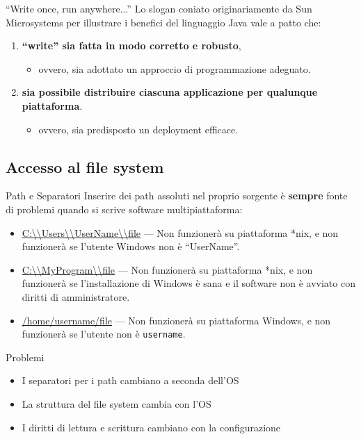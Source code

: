 \documentclass[presentation]{beamer}
\begin{document}
\begin{frame}{``Write once, run anywhere...''}
	Lo slogan coniato originariamente da Sun Microsystems per illustrare i benefici del linguaggio Java vale a patto che:
	\begin{enumerate}\itemsep10pt
		\item \textbf{``write'' sia fatta in modo corretto e robusto},
		\begin{itemize}
			\item ovvero, sia adottato un approccio di programmazione adeguato.
		\end{itemize}
			\item \textbf{sia possibile distribuire ciascuna applicazione per qualunque piattaforma}.
		\begin{itemize}
			\item ovvero, sia predisposto un deployment efficace. 
		\end{itemize}
	\end{enumerate}
\end{frame}

\subsection{Accesso al file system}

\begin{frame}{Path e Separatori}
	Inserire dei path assoluti nel proprio sorgente è \textbf{sempre} fonte di problemi quando si scrive software multipiattaforma:
	\begin{itemize}
		\item \url{C:\\Users\\UserName\\file} --- Non funzionerà su piattaforma *nix, e non funzionerà se l'utente Windows non è ``UserName''.
		\item \url{C:\\MyProgram\\file} --- Non funzionerà su piattaforma *nix, e non funzionerà se 
l'installazione di Windows è sana e il software non è avviato con diritti di amministratore.
		\item \url{/home/username/file} --- Non funzionerà su piattaforma Windows, e non funzionerà se l'utente non è \texttt{username}.
	\end{itemize}
	\begin{block}{Problemi}
		\begin{itemize}
			\item I separatori per i path cambiano a seconda dell'OS
			\item La struttura del file system cambia con l'OS
			\item I diritti di lettura e scrittura cambiano con la configurazione
		\end{itemize}
		\end{block}
\end{frame}
\end{document}
